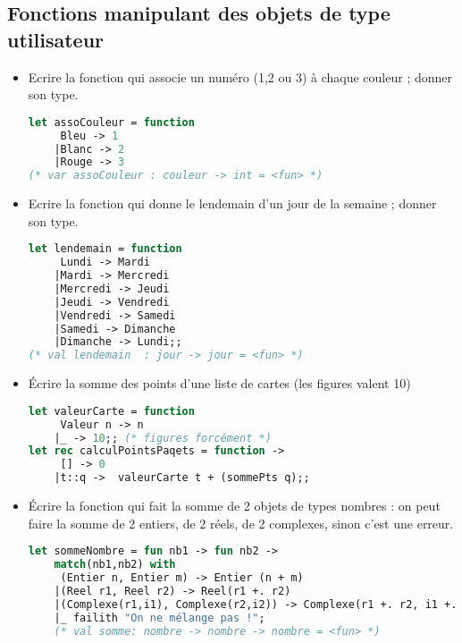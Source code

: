 \subsection{Fonctions manipulant des objets de type utilisateur}
\begin{exemple}
	\begin{itemize}
		\item Ecrire la fonction qui associe un numéro (1,2 ou 3) à chaque couleur ; donner son type.
	\begin{lstlisting}[language=Caml, numbers=none, framerule=0pt]
let assoCouleur = function 
	 Bleu -> 1
	|Blanc -> 2
	|Rouge -> 3
(* var assoCouleur : couleur -> int = <fun> *)	
	\end{lstlisting}
\item Ecrire la fonction qui donne le lendemain d'un jour de la semaine ; donner son type.
	\begin{lstlisting}[language=Caml, numbers=none, framerule=0pt]
let lendemain = function
	 Lundi -> Mardi
	|Mardi -> Mercredi
	|Mercredi -> Jeudi
	|Jeudi -> Vendredi
	|Vendredi -> Samedi
	|Samedi -> Dimanche
	|Dimanche -> Lundi;;
(* val lendemain  : jour -> jour = <fun> *)	
	\end{lstlisting}
\item Écrire la somme des points d'une liste de cartes (les figures valent 10)
	\begin{lstlisting}[language=Caml, numbers=none, framerule=0pt]
let valeurCarte = function
	 Valeur n -> n 
	|_ -> 10;; (* figures forcément *)
let rec calculPointsPaqets = function ->
	 [] -> 0	
	|t::q ->  valeurCarte t + (sommePts q);;
	\end{lstlisting}
\item Écrire la fonction qui fait la somme de 2 objets de types nombres : on peut faire la somme de 2 entiers, de 2 réels, de 2 complexes, sinon c'est
	une erreur.
	\begin{lstlisting}[language=Caml, numbers=none, framerule=0pt]
let sommeNombre = fun nb1 -> fun nb2 ->
	match(nb1,nb2) with
	 (Entier n, Entier m) -> Entier (n + m)
	|(Reel r1, Reel r2) -> Reel(r1 +. r2)
	|(Complexe(r1,i1), Complexe(r2,i2)) -> Complexe(r1 +. r2, i1 +. i2);;
	|_ failith "On ne mélange pas !";
	(* val somme: nombre -> nombre -> nombre = <fun> *)
	\end{lstlisting}
	\end{itemize}
\end{exemple}

